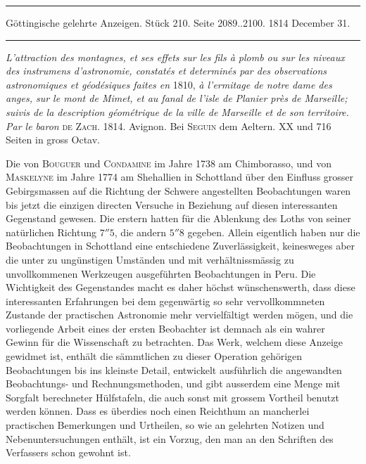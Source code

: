 \par\bigskip
\hypertarget{native-574-lower}{}
\begin{center}
\parbox{.92\linewidth}{\centering\small
\rule{\linewidth}{.3pt}\par\smallskip
Göttingische gelehrte Anzeigen. Stück 210. Seite 2089..2100. 1814 December 31.\par\smallskip
\rule{\linewidth}{.3pt}}
\end{center}
\par\medskip

\emph{L'attraction des montagnes, et ses effets sur les fils à plomb ou sur les niveaux des
instrumens d'astronomie, constatés et determinés par des observations astronomiques et
géodésiques faites en} 1810, \emph{à l'ermitage de notre dame des anges, sur le mont de Mimet, et
au fanal de l'isle de Planier près de Marseille; suivis de la description géométrique de la
ville de Marseille et de son territoire. Par le baron} \textsc{de Zach}. 1814.
Avignon. Bei \textsc{Seguin} dem Aeltern. XX und 716 Seiten in gross Octav.

Die von \textsc{Bouguer} und \textsc{Condamine} im Jahre 1738 am Chimborasso, und von
\textsc{Maskelyne} im Jahre 1774 am Shehallien
 in Schottland über den Einfluss grosser Gebirgsmassen auf die Richtung der Schwere
angestellten Beobachtungen waren bis jetzt die einzigen directen Versuche in Beziehung auf
diesen interessanten Gegenstand gewesen. Die erstern hatten für die Ablenkung des Loths von
seiner natürlichen Richtung $7''5$, die andern $5''8$ gegeben. Allein eigentlich haben nur
die Beobachtungen in Schottland eine entschiedene Zuverlässigkeit, keinesweges aber die
unter zu ungünstigen Umständen und mit verhältnissmässig zu unvollkommenen Werkzeugen
ausgeführten Beobachtungen in Peru. Die Wichtigkeit des Gegenstandes macht es daher höchst
wünschenswerth, dass diese interessanten Erfahrungen bei dem gegenwärtig so sehr
vervollkommneten Zustande der practischen Astronomie mehr vervielfältigt werden mögen, und
die vorliegende Arbeit eines der ersten Beobachter ist demnach als ein wahrer Gewinn für die
Wissenschaft zu betrachten. Das Werk, welchem diese Anzeige gewidmet ist, enthält die
sämmtlichen zu dieser Operation gehörigen Beobachtungen bis ins kleinste Detail, entwickelt
ausführlich die angewandten Beobachtungs- und Rechnungsmethoden, und gibt ausserdem eine
Menge mit Sorgfalt berechneter Hülfstafeln, die auch sonst mit grossem Vortheil benutzt
werden können. Dass es überdies noch einen Reichthum an mancherlei practischen Bemerkungen
und Urtheilen, so wie an gelehrten Notizen und Nebenuntersuchungen enthält, ist ein
Vorzug, den man an den Schriften des Verfassers schon gewohnt ist.

